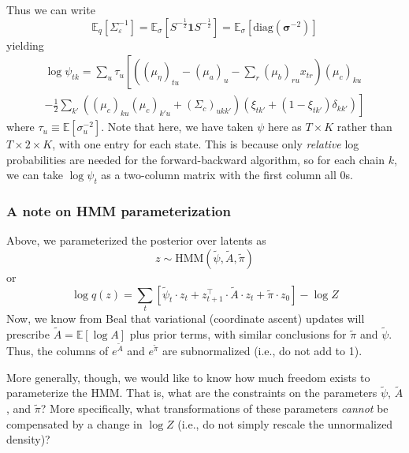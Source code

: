 \documentclass[11pt]{article}
\begin{document}
Thus we can write
\begin{equation}
    \mathbb{E}_q\left[\Sigma_\varepsilon^{-1}\right] =
    \mathbb{E}_\sigma \left[ S^{-\frac{1}{2}} \mathbf{1} S^{-\frac{1}{2}}\right]
    = \mathbb{E}_\sigma \left[\mathrm{diag}(\boldsymbol{\sigma}^{-2}) \right]
\end{equation}
yielding
\begin{multline}
    \log \psi_{tk} = \sum_u \tau_u \left[
    \left((\mu_\eta)_{tu} - (\mu_a)_{u} - \sum_r (\mu_b)_{ru} x_{tr}
    \right)
    (\mu_c)_{ku} \right .\\
    \left.
     -\frac{1}{2} \sum_{k'}((\mu_c)_{ku}(\mu_c)_{k'u} + (\Sigma_c)_{ukk'})(\xi_{tk'} + (1 - \xi_{tk'})\delta_{kk'})\right]
\end{multline}
where $\tau_u \equiv \mathbb{E}[\sigma_u^{-2}]$.
Note that here, we have taken $\psi$ here as $T \times K$ rather than $T \times 2 \times K$, with one entry for each state. This is because only \emph{relative} log probabilities are needed for the forward-backward algorithm, so for each chain $k$, we can take $\log \psi_t$ as a two-column matrix with the first column all 0s.

\subsubsection{A note on HMM parameterization}
Above, we parameterized the posterior over latents as
\begin{equation}
    z \sim \mathrm{HMM}(\tilde{\psi}, \tilde{A}, \tilde{\pi})
\end{equation}
or
\begin{equation}
    \log q(z) = \sum_ t \left[\tilde{\psi}_t \cdot z_t + z_{t + 1}^\top \cdot \tilde{A} \cdot z_t + \tilde{\pi} \cdot z_0\right] - \log Z
\end{equation}
Now, we know from Beal that variational (coordinate ascent) updates will prescribe $\tilde{A} = \mathbb{E}[\log A]$ plus prior terms, with similar conclusions for $\tilde{\pi}$ and $\tilde{\psi}$. Thus, the columns of $e^{\tilde{A}}$ and $e^{\tilde{\pi}}$ are subnormalized (i.e., do not add to 1).

More generally, though, we would like to know how much freedom exists to parameterize the HMM. That is, what are the constraints on the parameters $\tilde{\psi}$, $\tilde{A}$, and $\tilde{\pi}$? More specifically, what transformations of these parameters \emph{cannot} be compensated by a change in $\log Z$ (i.e., do not simply rescale the unnormalized density)?
\end{document}
